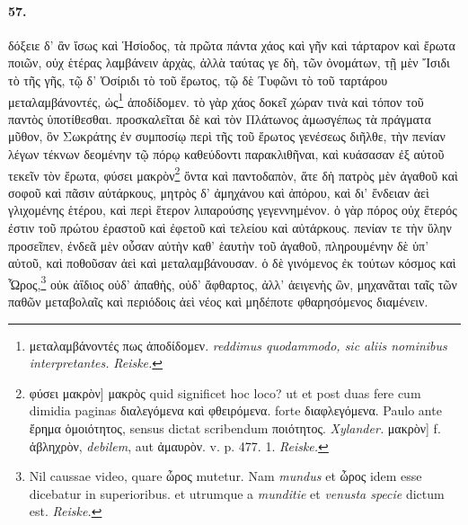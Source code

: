 \documentclass[a4paper, 11pt, oneside, polutonikogreek, german]{article}
\begin{document}
\paragraph{57.}
δόξειε δ' ἂν ἴσως καὶ Ἡσίοδος, τὰ πρῶτα πάντα χάος καὶ γῆν καὶ τάρταρον καὶ ἔρωτα ποιῶν, οὐχ ἑτέρας λαμβάνειν ἀρχὰς, ἀλλὰ ταύτας γε δὴ, τῶν ὀνομάτων, τῇ μὲν Ἴσιδι τὸ τῆς γῆς, τῷ δ' Ὀσίριδι τὸ τοῦ ἔρωτος, τῷ δὲ Τυφῶνι τὸ τοῦ ταρτάρου μεταλαμβάνοντές, ὡς\footnote{μεταλαμβάνοντές πως ἀποδίδομεν. \emph{reddimus quodammodo, sic aliis nominibus interpretantes.} \emph{Reiske.}} ἀποδίδομεν. τὸ γὰρ χάος δοκεῖ χώραν τινὰ καὶ τόπον τοῦ παντὸς ὑποτίθεσθαι. προσκαλεῖται δὲ καὶ τὸν Πλάτωνος ἀμωσγέπως τὰ πράγματα μῦθον, ὃν Σωκράτης ἐν συμποσίῳ περὶ τῆς τοῦ ἔρωτος γενέσεως διῆλθε, τὴν πενίαν λέγων τέκνων δεομένην τῷ πόρῳ καθεύδοντι παρακλιθῆναι, καὶ κυάσασαν ἐξ αὐτοῦ τεκεῖν τὸν ἔρωτα, φύσει μακρὸν\footnote{φύσει μακρὸν] μακρὸς quid significet hoc loco? ut et post duas fere cum dimidia paginas διαλεγόμενα καὶ φθειρόμενα. forte διαφλεγόμενα. Paulo ante ἔρημα ὁμοιότητος, sensus dictat scribendum ποιότητος. \emph{Xylander.} μακρὸν] f. ἀβληχρὸν, \emph{debilem}, aut ἀμαυρὸν. v. p. 477. 1. \emph{Reiske.} } ὄντα καὶ παντοδαπὸν, ἅτε δὴ πατρὸς μὲν ἀγαθοῦ καὶ σοφοῦ καὶ πᾶσιν αὐτάρκους, μητρὸς δ' ἀμηχάνου καὶ ἀπόρου, καὶ δι' ἔνδειαν ἀεὶ γλιχομένης ἑτέρου, καὶ περὶ ἕτερον λιπαρούσης γεγεννημένον. ὁ γὰρ πόρος οὐχ ἕτερός ἐστιν τοῦ πρώτου ἐραστοῦ καὶ ἐφετοῦ καὶ τελείου καὶ αὐτάρκους. πενίαν τε τὴν ὕλην προσεῖπεν, ἐνδεᾶ μὲν οὖσαν αὐτὴν καθ' ἑαυτὴν τοῦ ἀγαθοῦ, πληρουμένην δὲ ὑπ' αὐτοῦ, καὶ ποθοῦσαν ἀεὶ καὶ μεταλαμβάνουσαν. ὁ δὲ γινόμενος ἐκ τούτων κόσμος καὶ Ὧρος,\footnote{Nil caussae video, quare ὦρος mutetur. Nam \emph{mundus} et ὦρος idem esse dicebatur in superioribus. et utrumque a \emph{munditie} et \emph{venusta specie} dictum est. \emph{Reiske.}} οὐκ ἀΐδιος οὐδ' ἀπαθὴς, οὐδ' ἄφθαρτος, ἀλλ' ἀειγενὴς ὢν, μηχανᾶται ταῖς τῶν παθῶν μεταβολαῖς καὶ περιόδοις ἀεὶ νέος καὶ μηδέποτε φθαρησόμενος διαμένειν.
\end{document}
